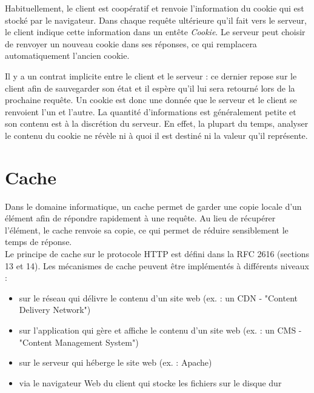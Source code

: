Habituellement, le client est coopératif et renvoie l'information du cookie qui est stocké par le navigateur. Dans chaque requête ultérieure qu'il fait vers le serveur, le client indique cette information dans un entête \textit{Cookie}. Le serveur peut choisir de renvoyer un nouveau cookie dans ses réponses, ce qui remplacera automatiquement l'ancien cookie.
\newline

Il y a un contrat implicite entre le client et le serveur : ce dernier repose sur le client afin de sauvegarder son état et il espère qu'il lui sera retourné lors de la prochaine requête. Un cookie est donc une donnée que le serveur et le client se renvoient l'un et l'autre. La quantité d'informations est généralement petite et son contenu est à la discrétion du serveur. En effet, la plupart du temps, analyser le contenu du cookie ne révèle ni à quoi il est destiné ni la valeur qu'il représente.


\section{Cache}
Dans le domaine informatique, un cache permet de garder une copie locale d'un élément afin de répondre rapidement à une requête. Au lieu de récupérer l'élément, le cache renvoie sa copie, ce qui permet de réduire sensiblement le temps de réponse.\\
Le principe de cache sur le protocole HTTP est défini dans la RFC 2616 \cite{IETF_RFC2616} (sections 13 et 14). Les mécanismes de cache peuvent être implémentés à différents niveaux :
\begin{itemize}
  \item sur le réseau qui délivre le contenu d'un site web (ex. : un CDN - "Content Delivery Network")
  \item sur l'application qui gère et affiche le contenu d'un site web (ex. : un CMS - "Content Management System")
  \item sur le serveur qui héberge le site web (ex. : Apache)
  \item via le navigateur Web du client qui stocke les fichiers sur le disque dur
  \newline
\end{itemize}

